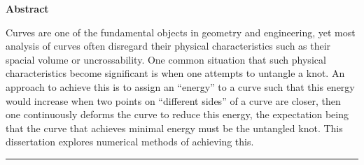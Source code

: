 \documentclass[../dissertation.tex]{subfiles}
\begin{document}
\thispagestyle{plain}
\begin{center}
    \Large
    \textbf{\titlename}
        
        
       
    \vspace{0.9cm}
    \textbf{Abstract}
\end{center}
Curves are one of the fundamental objects in geometry and engineering,
yet most analysis of curves often disregard their physical characteristics such as their spacial volume or uncrossability.
One common situation that such physical characteristics become significant is when one attempts to untangle a knot.
An approach to achieve this is to assign an ``energy'' to a curve such that
this energy would increase when two points on ``different sides'' of a curve are closer,
then one continuously deforms the curve to reduce this energy, 
the expectation being that the curve that achieves minimal energy must be the untangled knot.
This dissertation explores numerical methods of achieving this.

\vspace{0.2cm}
\hrule
\end{document}
